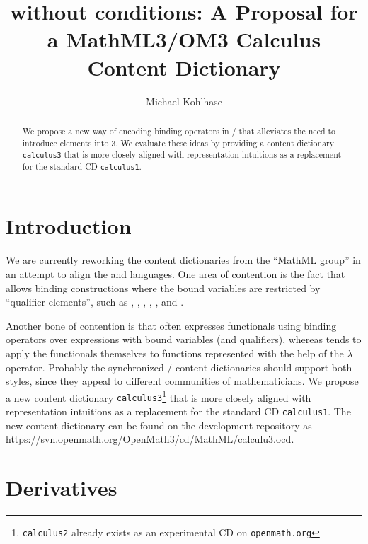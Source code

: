 \documentclass[12pt]{article}
\title{{\openmath3} without conditions: A Proposal for a MathML3/OM3 Calculus Content Dictionary}
\author{Michael Kohlhase}
\begin{document}
\maketitle
\begin{abstract}
  We propose a new way of encoding binding operators in {\openmath/\mathml} that
  alleviates the need to introduce {} elements into {\openmath}3. We
  evaluate these ideas by providing a content dictionary {\texttt{calculus3}} that is more
  closely aligned with {} representation intuitions as a replacement for the
  {\openmath} standard CD {\texttt{calculus1}}.
\end{abstract}

\section{Introduction}
We are currently reworking the {\openmath} content dictionaries from the ``MathML group''
in an attempt to align the {} and {} languages. One area of contention
is the fact that {\mathml} allows binding constructions where the bound variables are
restricted by ``qualifier elements'', such as {},
{}, {}, {}, {}, and
{}.

Another bone of contention is that {\mathml} often expresses functionals using binding
operators over expressions with bound variables (and qualifiers), whereas {\openmath}
tends to apply the functionals themselves to functions represented with the help of the
$\lambda$ operator. Probably the synchronized {}/{} content dictionaries
should support both styles, since they appeal to different communities of
mathematicians. We propose a new content dictionary
{\texttt{calculus3}}\footnote{{\texttt{calculus2}} already exists as an experimental CD on
  {\texttt{openmath.org}}} that is more closely aligned with {} representation
intuitions as a replacement for the {\openmath} standard CD {\texttt{calculus1}}. The new
content dictionary can be found on the {} development repository as
{\url{https://svn.openmath.org/OpenMath3/cd/MathML/calculu3.ocd}}.

\section{Derivatives}
\end{document}

